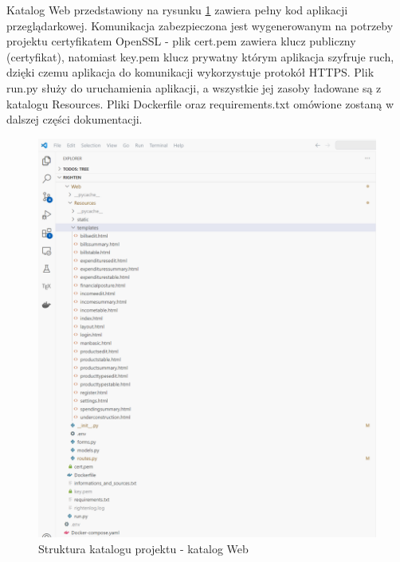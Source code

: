 \documentclass[a4paper, 10pt, twoside, openright]{report}
\begin{document}
\begin{large}
{Katalog Web przedstawiony na rysunku \ref*{fig:projectdirectoryweb} zawiera 
pełny kod aplikacji przeglądarkowej. Komunikacja zabezpieczona jest 
wygenerowanym na potrzeby projektu certyfikatem OpenSSL - plik cert.pem zawiera 
klucz publiczny (certyfikat), natomiast key.pem klucz prywatny którym aplikacja 
szyfruje ruch, dzięki czemu aplikacja do komunikacji wykorzystuje protokół 
HTTPS. Plik run.py służy do uruchamienia aplikacji, a wszystkie jej zasoby 
ładowane są z katalogu Resources. Pliki Dockerfile oraz requirements.txt 
omówione zostaną w dalszej części dokumentacji.}

\begin{figure}[H]           %
    \centering
    \includegraphics[width=12cm]{figures/Righten_project_directory_web.png}
    \caption{Struktura katalogu projektu - katalog Web}
    \label{fig:projectdirectoryweb}
\end{figure}


\end{large}
\end{document}

